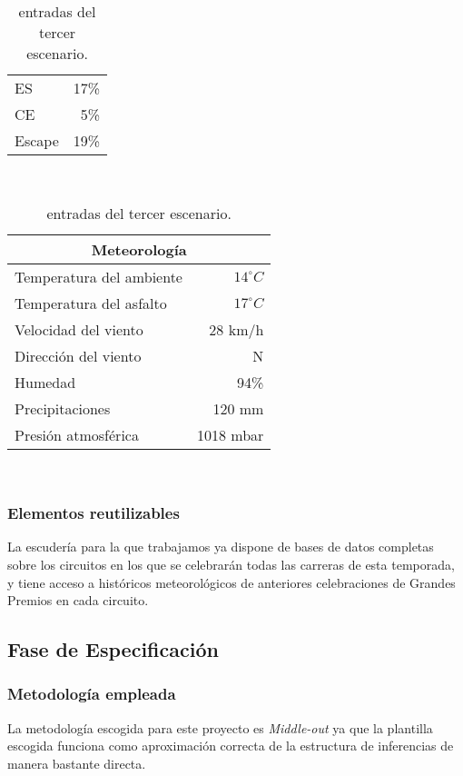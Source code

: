 \documentclass[12pt,a4paper,twoside,spanish]{article}      %
\begin{document}
\begin{table}[H]
\begin{tabular}{lr}
        ES & 17\% \\
        CE & 5\% \\
        Escape & 19\% \\ \bottomrule
    \end{tabular} \\ \vspace{1em}
    \begin{tabular}{lr}
        \toprule
        \multicolumn{2}{c}{\textbf{Meteorología}} \\ \midrule
        Temperatura del ambiente & $14^\circ C$ \\
        Temperatura del asfalto & $17^\circ C$ \\
        Velocidad del viento & 28 km/h \\
        Dirección del viento & N \\
        Humedad & 94\% \\
        Precipitaciones & 120 mm \\
        Presión atmosférica & 1018 mbar \\ \bottomrule
    \end{tabular} \\ \vspace{1em}
    \caption{entradas del tercer escenario.}
    \label{tab:in_esc_2}
\end{table}

\subsubsection{Elementos reutilizables}
La escudería para la que trabajamos ya dispone de bases de datos completas sobre los circuitos en los que se celebrarán todas las carreras de esta temporada, y tiene acceso a históricos meteorológicos de anteriores celebraciones de Grandes Premios en cada circuito.

\subsection{Fase de Especificación}

\subsubsection{Metodología empleada}
La metodología escogida para este proyecto es \textit{Middle-out} ya que la plantilla escogida funciona como aproximación correcta de la estructura de inferencias de manera bastante directa.
\end{document}
